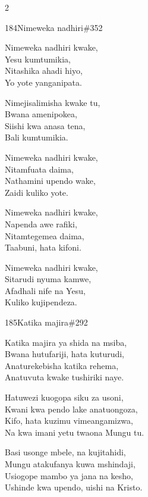 \documentclass{article}
\begin{document}
\begin{multicols}{2}
\begin{hymn}{184}{Nimeweka nadhiri}{\#352}
\begin{stanza}
Nimeweka nadhiri kwake,\\
Yesu kumtumikia,\\
Nitashika ahadi hiyo,\\
Yo yote yanganipata.
\end{stanza}
\begin{chorus}
Nimejisalimisha kwake tu,\\
Bwana amenipokea,\\
Siishi kwa anasa tena,\\
Bali kumtumikia.
\end{chorus}
\begin{stanza}
Nimeweka nadhiri kwake,\\
Nitamfuata daima,\\
Nathamini upendo wake,\\
Zaidi kuliko yote.
\end{stanza}
\begin{stanza}
Nimeweka nadhiri kwake,\\
Napenda awe rafiki,\\
Nitamtegemea daima,\\
Taabuni, hata kifoni.
\end{stanza}
\begin{stanza}
Nimeweka nadhiri kwake,\\
Sitarudi nyuma kamwe,\\
Afadhali nife na Yesu,\\
Kuliko kujipendeza.
\end{stanza}
\end{hymn}

\begin{hymn}{185}{Katika majira}{\#292}
\begin{stanza}
Katika majira ya shida na msiba,\\
Bwana hutufariji, hata kuturudi,\\
Anaturekebisha katika rehema,\\
Anatuvuta kwake tushiriki naye.
\end{stanza}
\begin{stanza}
Hatuwezi kuogopa siku za usoni,\\
Kwani kwa pendo lake anatuongoza,\\
Kifo, hata kuzimu vimeangamizwa,\\
Na kwa imani yetu twaona Mungu tu.
\end{stanza}
\begin{stanza}
Basi usonge mbele, na kujitahidi,\\
Mungu atakufanya kuwa mshindaji,\\
Usiogope mambo ya jana na kesho,\\
Ushinde kwa upendo, uishi na Kristo.
\end{stanza}
\end{hymn}


\end{multicols}
\end{document}
